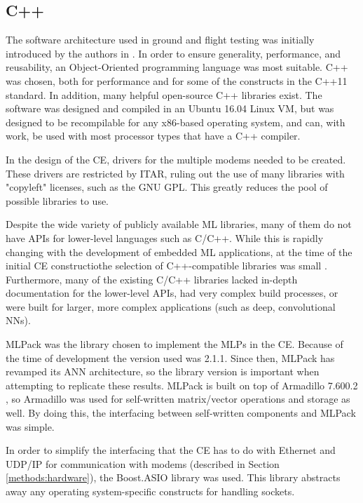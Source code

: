\subsection{C++}
\par The software architecture used in ground and flight testing was initially introduced by the authors in \cite{tim_implementation_paper}. In order to ensure generality, performance, and reusability, an Object-Oriented programming language was most suitable. C++ was chosen, both for performance and for some of the constructs in the C++11 standard. In addition, many helpful open-source C++ libraries exist. The software was designed and compiled in an Ubuntu 16.04 Linux VM, but was designed to be recompilable for any x86-based operating system, and can, with work, be used with most processor types that have a C++ compiler.
\par In the design of the CE, drivers for the multiple modems needed to be created. These drivers are restricted by ITAR, ruling out the use of many libraries with "copyleft" licenses, such as the GNU GPL. This greatly reduces the pool of possible libraries to use. 
\par Despite the wide variety of publicly available ML libraries, many of them do not have APIs for lower-level languages such as C/C++. While this is rapidly changing with the development of embedded ML applications, at the time of the initial CE constructiothe selection of C++-compatible libraries was small \cite{tim_implementation_paper}. Furthermore, many of the existing C/C++ libraries lacked in-depth documentation for the lower-level APIs, had very complex build processes, or were built for larger, more complex applications (such as deep, convolutional NNs). 
\par MLPack \cite{placeholderCitation} was the library chosen to implement the MLPs in the CE. Because of the time of development the version used was 2.1.1. Since then, MLPack has revamped its ANN architecture, so the library version is important when attempting to replicate these results. MLPack is built on top of Armadillo 7.600.2 \cite{placeholderCitation}, so Armadillo was used for self-written matrix/vector operations and storage as well. By doing this, the interfacing between self-written components and MLPack was simple. 
\par In order to simplify the interfacing that the CE has to do with Ethernet and UDP/IP for communication with modems (described in Section \ref{methods:hardware}), the Boost.ASIO \cite{placeholderCitation} library was used. This library abstracts away any operating system-specific constructs for handling sockets.
